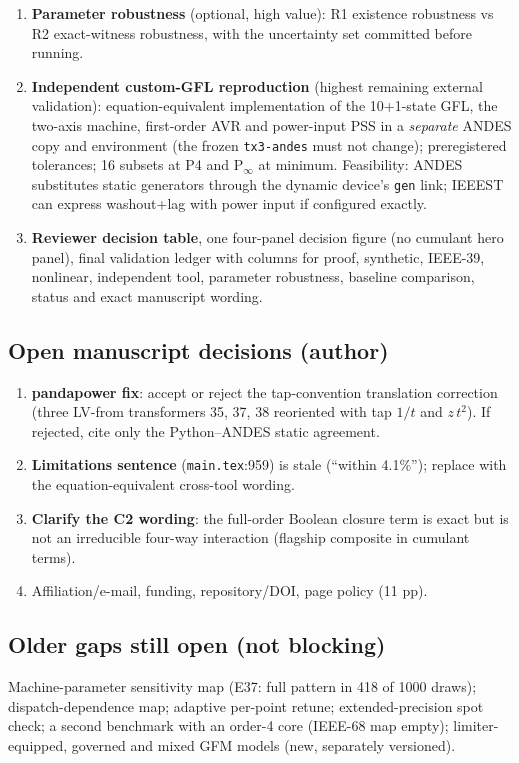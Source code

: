 \documentclass[10pt,a4paper]{article}
\theoremstyle{definition}
\newcommand{\aperp}{\alpha_\perp}
\begin{document}
\begin{enumerate}
restored? $\Delta\aperp$? port prediction? Newton boundary? TDS corroboration?
\item \textbf{Parameter robustness} (optional, high value): R1 existence robustness vs R2 exact-witness robustness,
with the uncertainty set committed before running.
\item \textbf{Independent custom-GFL reproduction} (highest remaining external validation): equation-equivalent
implementation of the 10+1-state GFL, the two-axis machine, first-order AVR and power-input PSS in a
\emph{separate} ANDES copy and environment (the frozen \texttt{tx3-andes} must not change); preregistered
tolerances; 16 subsets at P4 and P$_\infty$ at minimum. Feasibility: ANDES substitutes static generators through
the dynamic device's \texttt{gen} link; IEEEST can express washout+lag with power input if configured exactly.
\item \textbf{Reviewer decision table}, one four-panel decision figure (no cumulant hero panel), final validation ledger
with columns for proof, synthetic, IEEE-39, nonlinear, independent tool, parameter robustness, baseline
comparison, status and exact manuscript wording.
\end{enumerate}

\subsection{Open manuscript decisions (author)}
\begin{enumerate}
\item \textbf{pandapower fix}: accept or reject the tap-convention translation correction (three LV-from
transformers 35, 37, 38 reoriented with tap $1/t$ and $z\,t^2$). If rejected, cite only the Python--ANDES static agreement.
\item \textbf{Limitations sentence} (\texttt{main.tex}:959) is stale (``within 4.1\%''); replace with the equation-equivalent
cross-tool wording.
\item \textbf{Clarify the C2 wording}: the full-order Boolean closure term is exact but is not an irreducible four-way
interaction (flagship composite in cumulant terms).
\item Affiliation/e-mail, funding, repository/DOI, page policy (11 pp).
\end{enumerate}

\subsection{Older gaps still open (not blocking)}
Machine-parameter sensitivity map (E37: full pattern in 418 of 1000 draws); dispatch-dependence map; adaptive
per-point retune; extended-precision spot check; a second benchmark with an order-4 core (IEEE-68 map empty);
limiter-equipped, governed and mixed GFM models (new, separately versioned).
\end{document}
